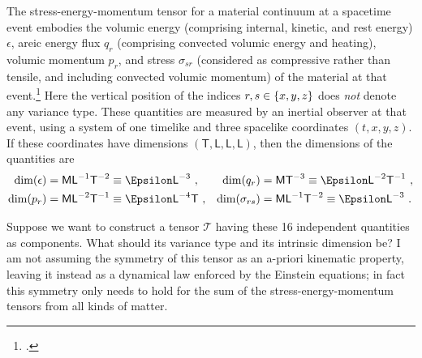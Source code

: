 \documentclass[\ifafour a4paper,12pt,\else a5paper,10pt,\fi%
onecolumn,oneside,article,%
british%
]{memoir}
\theoremstyle{remark}
\theoremstyle{innote}
\newcommand*{\citep}{\footcites}
\DeclarePairedDelimiter\set{\{}{\}}
\renewcommand*{\|}[1][]{\nonscript\,#1\vert\nonscript\;\mathopen{}}
\newcommand*{\sect}{\S}%
\newcommand*{\Le}{\textsf{L}}
\newcommand*{\Ti}{\textsf{T}}
\newcommand*{\Ma}{\textsf{M}}
\newcommand*{\En}{\Epsilon}%
\newcommand*{\yT}{\bm{\mathcal{T}}}
\newcommand*{\en}{\epsilon}
\newcommand*{\yq}{q}
\newcommand*{\yp}{p}
\newcommand*{\yt}{\sigma}
\begin{document}
The stress-energy-momentum tensor for a material continuum at a spacetime
event embodies the volumic energy (comprising internal, kinetic, and rest
energy) $\en$, areic energy flux $\yq_{r}$ (comprising convected volumic
energy and heating), volumic momentum $\yp_{r}$, and stress $\yt_{sr}$
(considered as compressive rather than tensile, and including convected
volumic momentum) of the material at that event.\citep[For the
\enquote{volumic} and \enquote{areic} terminology see][\sect~A.6]{iso2009}
Here the vertical position of the indices $r,s \in \set{x,y,z}$ does
\emph{not} denote any variance type. These quantities are measured by an
inertial observer at that event, using a system of one timelike and three
spacelike coordinates $(t,x,y,z)$. If these coordinates have dimensions
$(\Ti,\Le,\Le,\Le)$, then the dimensions of the quantities are
\begin{equation}\label{eq:dims_stress_components}
  \begin{aligned}
    \dim(\en) &=\Ma\Le^{-1}\Ti^{-2} \equiv  \En\Le^{-3} \ ,
    &
    \dim(\yq_{r}) &=\Ma\Ti^{-3} \equiv  \En\Le^{-2}\Ti^{-1} \ ,
    \\
    \dim(\yp_{r}) &=\Ma\Le^{-2}\Ti^{-1} \equiv  \En\Le^{-4}\Ti \ ,
    &
    \dim(\yt_{rs}) &=\Ma\Le^{-1}\Ti^{-2} \equiv  \En\Le^{-3} \ .
  \end{aligned}
\end{equation}

Suppose we want to construct a tensor $\yT$ having these 16 independent
quantities as components. What should its variance type and its intrinsic
dimension be? I am not assuming the symmetry of this tensor as an a-priori
kinematic property, leaving it instead as a dynamical law enforced by the
Einstein equations; in fact this symmetry only needs to hold for the sum of
the stress-energy-momentum tensors from all kinds of matter.
\end{document}
